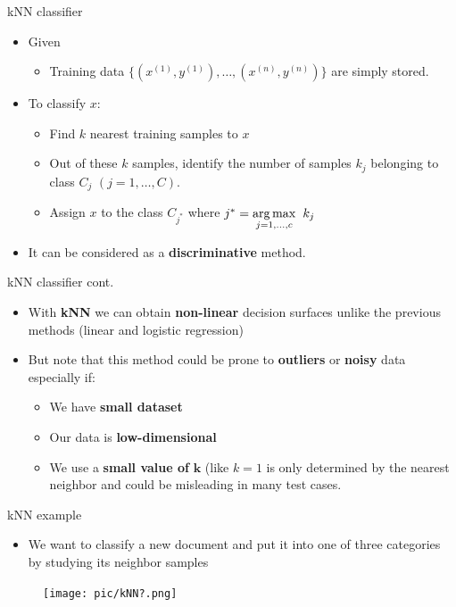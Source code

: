 \documentclass[serif, aspectratio=169]{beamer}
\begin{document}
\begin{frame}{kNN classifier}
    \begin{itemize}
        \item Given
            \begin{itemize}
                \item Training data $\{(x^{(1)}, y^{(1)}), \dots, (x^{(n)}, y^{(n)})\}$ are simply stored.
            \end{itemize}
        \item To classify $x$:
            \begin{itemize}
                \item Find $k$ nearest training samples to $x$
                \item Out of these $k$ samples, identify the number of samples $k_j$ belonging to class $C_j$ $(j=1, \dots, C)$.
                \item Assign $x$ to the class $C_{j^*}$ where $j^*=\underset{j=1,\dots, c}{\arg\max} \hspace{0.2cm} k_j$
            \end{itemize}
        \item It can be considered as a \textbf{discriminative} method.
    \end{itemize}
\end{frame}
\begin{frame}{kNN classifier cont.}
    \begin{itemize}
        \item With \textbf{kNN} we can obtain \textbf{non-linear} decision surfaces unlike the previous methods (linear and logistic regression)
        \item But note that this method could be prone to \textbf{outliers} or \textbf{noisy} data especially if:
        \begin{itemize}
            \item We have \textbf{small dataset}
            \item Our data is \textbf{low-dimensional}
            \item We use a \textbf{small value of} $\mathbf{k}$ (like $k=1$ is only determined by the nearest neighbor and could be misleading in many test cases.
        \end{itemize}
    \end{itemize}
\end{frame}
\begin{frame}{kNN example}
    \begin{itemize}
        \item We want to classify a new document and put it into one of three categories by studying its neighbor samples
    \end{itemize}
    \begin{figure}[h]
            \centering
            
            \texttt{[image: pic/kNN?.png]}
            \end{figure}
\end{frame}
\end{document}
